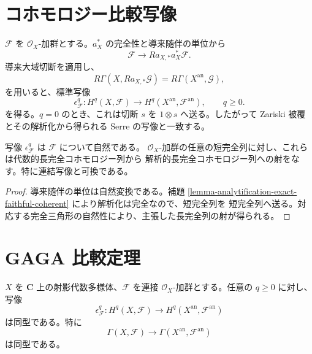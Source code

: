 \section{コホモロジー比較写像}
\label{section-analytification-cohomology-map}

\begin{definition}[コホモロジー比較写像]
\label{construction-analytification-cohomology-map}
\begin{reference}
\cite[\S 3、第11項]{GAGA}
\end{reference}
$\mathcal F$ を $\mathcal O_X$-加群とする。$a_X^*$ の完全性と導来随伴の単位から
$$
\mathcal F\longrightarrow Ra_{X,*}a_X^*\mathcal F.
$$
導来大域切断を適用し、
$$
R\Gamma(X,Ra_{X,*}\mathcal G)
=R\Gamma(X^{\mathrm{an}},\mathcal G),
$$
を用いると、標準写像
$$
\epsilon^q_{\mathcal F}:
H^q(X,\mathcal F)\longrightarrow
H^q(X^{\mathrm{an}},\mathcal F^{\mathrm{an}}),
\qquad q\geq0.
$$
を得る。$q=0$ のとき、これは切断 $s$ を $1\otimes s$ へ送る。したがって Zariski
被覆とその解析化から得られる Serre の写像と一致する。
\end{definition}

\begin{lemma}
\label{lemma-analytification-cohomology-map-functorial}
写像 $\epsilon^q_{\mathcal F}$ は $\mathcal F$ について自然である。
$\mathcal O_X$-加群の任意の短完全列に対し、これらは代数的長完全コホモロジー列から
解析的長完全コホモロジー列への射をなす。特に連結写像と可換である。
\end{lemma}

\begin{proof}
導来随伴の単位は自然変換である。補題
\ref{lemma-analytification-exact-faithful-coherent} により解析化は完全なので、短完全列を
短完全列へ送る。対応する完全三角形の自然性により、主張した長完全列の射が得られる。
\end{proof}


\section{GAGA 比較定理}
\label{section-gaga-statements}

\begin{theorem}[コホモロジー比較]
\label{theorem-gaga-cohomology}
\begin{reference}
\cite[\S 3、第12項、定理1]{GAGA}
\end{reference}
$X$ を $\mathbf C$ 上の射影代数多様体、$\mathcal F$ を連接
$\mathcal O_X$-加群とする。任意の $q\geq0$ に対し、写像
$$
\epsilon^q_{\mathcal F}:H^q(X,\mathcal F)
\longrightarrow H^q(X^{\mathrm{an}},\mathcal F^{\mathrm{an}})
$$
は同型である。特に
$$
\Gamma(X,\mathcal F)\longrightarrow
\Gamma(X^{\mathrm{an}},\mathcal F^{\mathrm{an}})
$$
は同型である。
\end{theorem}


